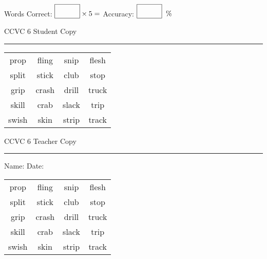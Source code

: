 \documentclass{memoir}
\begin{document}
\small

Words Correct: $\fbox{\phantom{\huge 100}} \times 5 = $ Accuracy: $\fbox{\phantom{\huge 100}}\;\; \%$ 

\vfill

\newpage


\footnotesize \noindent
CCVC 6 \hfill Student Copy
\smallskip
\hrule

\Large

\setlength{\tabcolsep}{14pt}
\def\arraystretch{3}

{\selectfont


\begin{vplace}[0.5]
\begin{center}
\begin{tabular}{cccc}
prop & fling & snip & flesh             \\
split & stick & club & stop \\
grip      & crash & drill & truck \\
skill & crab        & slack            & trip \\
swish & skin & strip & track       \\
\end{tabular}
\end{center}
\end{vplace}

}

\newpage

\footnotesize \noindent
CCVC 6 \hfill Teacher Copy
\smallskip
\hrule

\small

\vfill

\noindent
Name: \underline{\hspace{1.75in}} \hfill Date: \underline{\hspace{1in}}

\Large

{\selectfont


\begin{vplace}[0.5]
\begin{center}
\begin{tabular}{cccc}
prop & fling & snip & flesh             \\
split & stick & club & stop \\
grip      & crash & drill & truck \\
skill & crab        & slack            & trip \\
swish & skin & strip & track       \\
\end{tabular}
\end{center}
\end{vplace}



}
\end{document}
